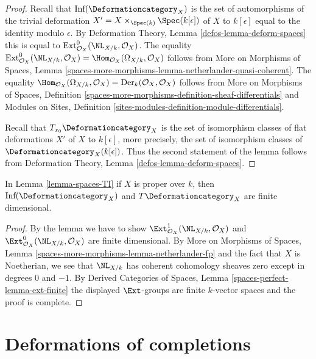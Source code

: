 \begin{proof}
Recall that $\text{Inf}(\Deformationcategory_X)$ is the set of
automorphisms of the trivial deformation
$X' = X \times_{\Spec(k)} \Spec(k[\epsilon])$ of $X$ to $k[\epsilon]$
equal to the identity modulo $\epsilon$.
By Deformation Theory, Lemma \ref{defos-lemma-deform-spaces}
this is equal to $\text{Ext}^0_{\mathcal{O}_X}(\NL_{X/k}, \mathcal{O}_X)$.
The equality $\text{Ext}^0_{\mathcal{O}_X}(\NL_{X/k}, \mathcal{O}_X) =
\Hom_{\mathcal{O}_X}(\Omega_{X/k}, \mathcal{O}_X)$ follows from
More on Morphisms of Spaces, Lemma
\ref{spaces-more-morphisms-lemma-netherlander-quasi-coherent}.
The equality
$\Hom_{\mathcal{O}_X}(\Omega_{X/k}, \mathcal{O}_X) =
\text{Der}_k(\mathcal{O}_X, \mathcal{O}_X)$
follows from More on Morphisms of Spaces, Definition
\ref{spaces-more-morphisms-definition-sheaf-differentials} and
Modules on Sites, Definition
\ref{sites-modules-definition-module-differentials}.

\medskip\noindent
Recall that $T_{x_0}\Deformationcategory_X$ is the set of isomorphism classes
of flat deformations $X'$ of $X$ to $k[\epsilon]$, more precisely,
the set of isomorphism classes of $\Deformationcategory_X(k[\epsilon])$.
Thus the second statement of the lemma follows from
Deformation Theory, Lemma \ref{defos-lemma-deform-spaces}.
\end{proof}

\begin{lemma}
\label{lemma-proper-spaces-TI}
In Lemma \ref{lemma-spaces-TI} if $X$ is proper over $k$, then
$\text{Inf}(\Deformationcategory_X)$ and $T\Deformationcategory_X$ are
finite dimensional.
\end{lemma}

\begin{proof}
By the lemma we have to show
$\Ext^1_{\mathcal{O}_X}(\NL_{X/k}, \mathcal{O}_X)$ and
$\Ext^0_{\mathcal{O}_X}(\NL_{X/k}, \mathcal{O}_X)$ are finite
dimensional. By More on Morphisms of Spaces, Lemma
\ref{spaces-more-morphisms-lemma-netherlander-fp}
and the fact that $X$ is Noetherian, we see that
$\NL_{X/k}$ has coherent cohomology sheaves zero except
in degrees $0$ and $-1$.
By Derived Categories of Spaces, Lemma \ref{spaces-perfect-lemma-ext-finite}
the displayed $\Ext$-groups are finite $k$-vector spaces
and the proof is complete.
\end{proof}





\section{Deformations of completions}
\label{section-compare}

